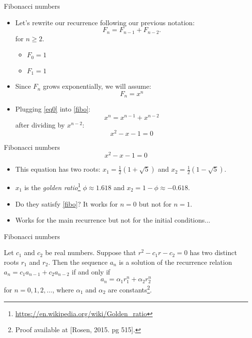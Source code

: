 \documentclass{beamer}
\begin{document}
\begin{frame}{Fibonacci numbers}
    \begin{itemize}
    \item Let's rewrite our recurrence following our previous notation:
    \begin{equation}\label{fibo}
        F_n = F_{n-1} + F_{n-2}. 
    \end{equation} 
    {\footnotesize for $n \geq 2$.}
        \begin{itemize}
            \item $F_0 = 1$ 
            \item $F_1 = 1$
        \end{itemize}
    \item Since $F_n$ grows exponentially, we will assume:
        \begin{equation}\label{eq0}
            F_n = x^n 
        \end{equation}
    \item Plugging \eqref{eq0} into \eqref{fibo}:
        $$ x^n = x^{n-1} + x^{n-2} $$
        after dividing by $x^{n-2}$: 
        $$ x^2 - x - 1 = 0 $$
    \end{itemize}
\end{frame}

\begin{frame}{Fibonacci numbers}
    $$ x^2 - x - 1 = 0 $$
    \begin{itemize}
     \item This equation has two roots: $x_1 = \frac{1}{2}(1 + \sqrt{5})$ and $x_2 = \frac{1}{2}(1 - \sqrt{5})$.
     \item $x_1$ is the \textit{golden ratio}\footnote{\scriptsize \url{https://en.wikipedia.org/wiki/Golden_ratio}} $\phi \approx 1.618$ and $x_2 = 1 - \phi \approx -0.618$.
     \item Do they satisfy \eqref{fibo}? It works for $n = 0$ but not for $n = 1$.
     \item Works for the main recurrence but not for the initial conditions...
    \end{itemize}
\end{frame}

\begin{frame}{Fibonacci numbers}
\begin{theorem}\label{theo:1}
Let $c_1$ and $c_2$ be real numbers. Suppose that $r^2 - c_1 r - c_2 = 0$ has two distinct roots $r_1$ and $r_2$. Then the sequence ${a_n}$ is a solution of the recurrence relation $a_n = c_1 a_{n−1} + c_2 a_{n−2}$ if and only if $$a_n = \alpha_1 r_1^n + \alpha_2 r_2^n$$ for $n = 0,1,2,\ldots$, where $\alpha_1$ and $\alpha_2$ are constants\footnote{\scriptsize Proof available at [Rosen, 2015. pg 515].}.
\end{theorem}
\end{frame}
\end{document}
